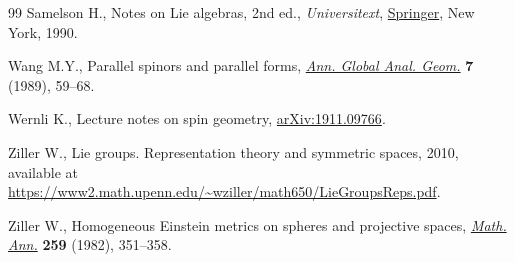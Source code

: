 \documentclass[pdftex]{sigma}
\numberwithin{equation}{section}
\begin{document}
\begin{thebibliography}{99}
Samelson H., Notes on {L}ie algebras, 2nd ed., \textit{Universitext}, \href{https://doi.org/10.1007/978-1-4613-9014-5}{Springer}, New
 York, 1990.

Wang M.Y., Parallel spinors and parallel forms, \href{https://doi.org/10.1007/BF00137402}{\textit{Ann. Global Anal.
 Geom.}} \textbf{7} (1989), 59--68.

Wernli K., Lecture notes on spin geometry, \href{https://arxiv.org/abs/1911.09766}{arXiv:1911.09766}.

Ziller W., Lie groups. {R}epresentation theory and symmetric spaces, 2010,
 available at
 \url{https://www2.math.upenn.edu/~wziller/math650/LieGroupsReps.pdf}.

Ziller W., Homogeneous {E}instein metrics on spheres and projective spaces,
 \href{https://doi.org/10.1007/BF01456947}{\textit{Math. Ann.}} \textbf{259} (1982), 351--358.

\end{thebibliography}\LastPageEnding
		
\end{document}
